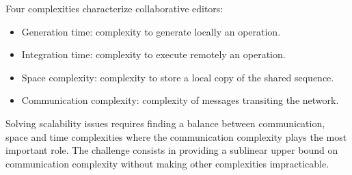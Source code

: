 \noindent Four complexities characterize collaborative editors:
\begin{itemize}
\item Generation time: complexity to generate locally an operation.
\item Integration time: complexity to execute remotely an operation.
\item Space complexity: complexity to store a local copy of the shared sequence.
\item Communication complexity: complexity of messages transiting the network.
\end{itemize}
Solving scalability issues requires finding a balance between communication,
space and time complexities %
where the communication complexity plays the most important role. The challenge
consists in providing a sublinear upper bound on communication complexity
without making other complexities impracticable.



